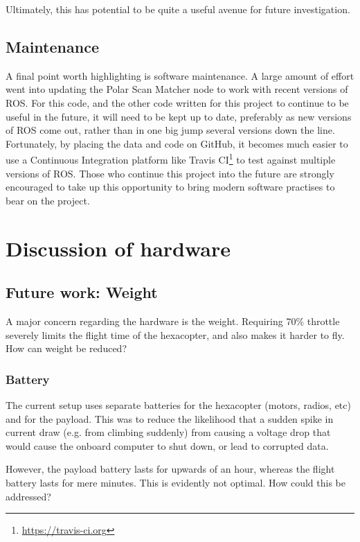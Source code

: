 \documentclass[12pt,oneside,a4paper,draft]{book}
\begin{document}
Ultimately, this has potential to be quite a useful avenue for future
investigation.

\subsection{Maintenance}
\label{sec:maintenance}

A final point worth highlighting is software maintenance. A large
amount of effort went into updating the Polar Scan Matcher node to
work with recent versions of ROS. For this code, and the other code
written for this project to continue to be useful in the future, it
will need to be kept up to date, preferably as new versions of ROS
come out, rather than in one big jump several versions down the
line. Fortunately, by placing the data and code on GitHub, it becomes
much easier to use a Continuous Integration platform like
Travis CI\footnote{\url{https://travis-ci.org}} to test against
multiple versions of ROS. Those who continue this project into the
future are strongly encouraged to take up this opportunity to bring
modern software practises to bear on the project.
\newpage
\section{Discussion of hardware}
\label{sec:discussion-hardware}
\subsection{Future work: Weight}
\label{sec:weight}

A major concern regarding the hardware is the weight. Requiring 70\%
throttle severely limits the flight time of the hexacopter, and also
makes it harder to fly. How can weight be reduced?

\subsubsection{Battery}
\label{sec:battery}

The current setup uses separate batteries for the hexacopter (motors,
radios, etc) and for the payload. This was to reduce the likelihood
that a sudden spike in current draw (e.g. from climbing suddenly) from
causing a voltage drop that would cause the onboard computer to shut
down, or lead to corrupted data.

However, the payload battery lasts for upwards of an hour, whereas the
flight battery lasts for mere minutes. This is evidently not
optimal. How could this be addressed?
\end{document}
